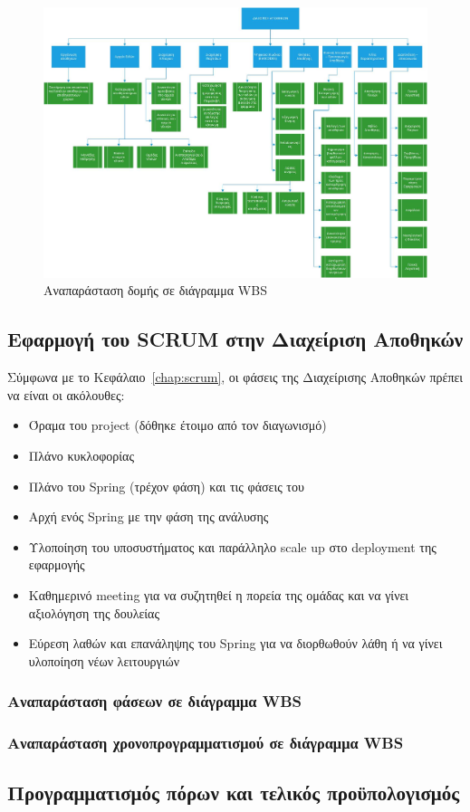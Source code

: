\begin{figure}[H]
  \centering
  \includegraphics[width=150mm]{Figures/wbs_ver1.jpg}
  \caption{Αναπαράσταση δομής σε διάγραμμα WBS}
  \label{fig:wbs_ver1}
\end{figure}

\subsection{Εφαρμογή του SCRUM στην Διαχείριση Αποθηκών}

Σύμφωνα με το Κεφάλαιο~\ref{chap:scrum}, οι φάσεις της Διαχείρισης Αποθηκών πρέπει να είναι οι ακόλουθες:

\begin{itemize}
  \item Όραμα του project (δόθηκε έτοιμο από τον διαγωνισμό)
  \item Πλάνο κυκλοφορίας
  \item Πλάνο του Spring (τρέχον φάση) και τις φάσεις του
  \item Αρχή ενός Spring με την φάση της ανάλυσης
  \item Υλοποίηση του υποσυστήματος και παράλληλο scale up στο deployment της εφαρμογής
  \item Καθημερινό meeting για να συζητηθεί η πορεία της ομάδας και να γίνει αξιολόγηση της δουλείας
  \item Εύρεση λαθών και επανάληψης του Spring για να διορθωθούν λάθη ή να γίνει υλοποίηση νέων λειτουργιών
\end{itemize}

\subsubsection{Αναπαράσταση φάσεων σε διάγραμμα WBS}

\subsubsection{Αναπαράσταση χρονοπρογραμματισμού σε διάγραμμα WBS}

\subsection{Προγραμματισμός πόρων και τελικός προϋπολογισμός}
